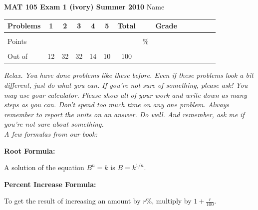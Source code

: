\documentclass[12pt]{article}
\begin{document}
\textbf{MAT 105 Exam 1 (ivory) Summer 2010} \hspace{.4in} {\large Name} \hrulefill

\begin{center}

\begin{tabular}
{|l|c|c|c|c|c|c|c|c|c|c|c|c|c|} \hline

 Problems & \hspace{5 pt} 1 \hspace{5 pt}  & \hspace{5 pt} 2 \hspace{5 pt} & \hspace{5 pt} 3 \hspace{5 pt} & \hspace{5 pt} 4 \hspace{5 pt} & \hspace{5 pt} 5 \hspace{5 pt} & \hspace{5 pt} Total  \hspace{5 pt} & &  \hspace{5 pt} Grade \hspace{5 pt}  \\ \hline
&&&&&&&&\\  
Points &&&&&&&    \hspace{.8in}\% &  \\ 
&&&&&&&& \\  \hline
Out of & 12 & 32 & 32 & 14 & 10 &100 & & \\ \hline

\end {tabular}

\end{center}

\vspace{.2in}

 \emph{Relax.  You have done problems like these before.  Even if these problems look a bit different, just do what you can.  If you're not sure of something, please ask! You may use your calculator.  Please show all of your work and write down as many steps as you can.  Don't spend too much time on any one problem.  Always remember to report the units on an answer. Do well.  And remember, ask me if you're not sure about something.} \\

\vspace{.5in} 
\noindent \emph{A few formulas from our book:}
\begin{center}

\textbf{Root Formula:} 

A solution of the equation $B^n=k$ is $B=k^{1/n}$.

\vspace{.2in} 

\textbf{Percent Increase Formula:} 

To get the result of increasing an amount by $r$\%, multiply by $1 + \frac{r}{100}$.

\end{center}
\end{document}
